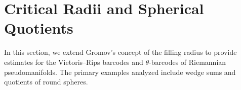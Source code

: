 
\section{Critical Radii and Spherical Quotients}\label{s:barcodes}

In this section, we extend Gromov's concept of the filling radius to provide estimates for the Vietoris--Rips barcodes and \(\theta\)-barcodes of Riemannian pseudomanifolds.
The primary examples analyzed include wedge sums and quotients of round spheres.





